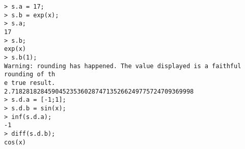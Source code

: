 \begin{center}\begin{minipage}{15cm}\begin{Verbatim}[frame=single]
> s.a = 17;
> s.b = exp(x);
> s.a;
17
> s.b;
exp(x)
> s.b(1);
Warning: rounding has happened. The value displayed is a faithful rounding of th
e true result.
2.71828182845904523536028747135266249775724709369998
> s.d.a = [-1;1];
> s.d.b = sin(x);
> inf(s.d.a);
-1
> diff(s.d.b);
cos(x)
\end{Verbatim}
\end{minipage}\end{center}
